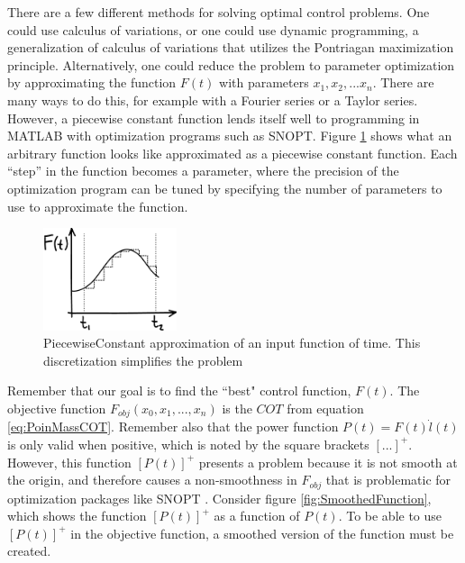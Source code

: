 
There are a few different methods for solving optimal control problems. One could use calculus of variations, or one could use dynamic programming, a generalization of calculus of variations that utilizes the Pontriagan maximization principle. Alternatively, one could reduce the problem to parameter optimization by approximating the function $F(t)$ with parameters $x_{1}, x_{2}, ... x_{n}$. There are many ways to do this, for example with a Fourier series or a Taylor series. However, a piecewise constant function lends itself well to programming in MATLAB with optimization programs such as SNOPT. Figure \ref{fig:PiecewiseConstant} shows what an arbitrary function looks like approximated as a piecewise constant function. Each ``step'' in the function becomes a parameter, where the precision of the optimization program can be tuned by specifying the number of parameters to use to approximate the function. 

\begin{figure}[h]		%
\begin{centering}
\includegraphics[width=0.35\textwidth]{Figures/PiecewiseConstant}\par
\end{centering}
\caption{PiecewiseConstant approximation of an input function of time. This discretization simplifies the problem }
\label{fig:PiecewiseConstant}
\end{figure}
%

Remember that our goal is to find the ``best" control function, $F(t)$. The objective function $F_{obj}(x_{0}, x_{1}, \mbox{...}, x_{n})$ is the $COT$ from equation \ref{eq:PoinMassCOT}. Remember also that the power function $P(t)=F(t)\dot{l}(t)$ is only valid when positive, which is noted by the square brackets $[\mbox{...}]^{+}$. However, this function $[P(t)]^{+}$ presents a problem because it is not smooth at the origin, and therefore causes a non-smoothness in $F_{obj}$ that is problematic for optimization packages like SNOPT . Consider figure \ref{fig:SmoothedFunction}, which shows the function $[P(t)]^{+}$ as a function of $P(t)$. To be able to use $[P(t)]^{+}$ in the objective function, a smoothed version of the function must be created.



